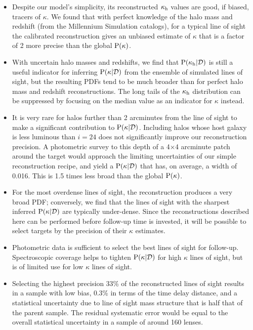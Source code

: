 \documentclass[useAMS,usenatbib]{mn2e}
\begin{document}
\begin{itemize} 

\item Despite our model's simplicity, its reconstructed $\kappa_{\rm h}$ values are
good, if biased, tracers of $\kappa$.  We found that with perfect knowledge of
the halo mass and redshift (from the Millennium Simulation catalogs), for a
typical line of sight the calibrated reconstruction gives an unbiased estimate
of $\kappa$ that is a factor of 2 more precise than the global ${\rm P}(\kappa)$.

\item With uncertain halo masses and redshifts, we find that
${\rm P}(\kappa_{\rm h}|{\mathcal{D}})$ is still a useful indicator for inferring
${\rm P}(\kappa|{\mathcal{D}})$ from the ensemble of simulated lines of sight, but the
resulting PDFs tend to be much broader than for perfect halo mass and redshift
reconstructions. The long tails of the $\kappa_{\rm h}$ distribution can be
suppressed by focusing on the median value as an indicator for $\kappa$
instead.

\item It is very rare for halos further than 2 arcminutes from the line of
sight to make a significant contribution to ${\rm P}(\kappa|{\mathcal{D}})$. Including
halos whose host galaxy is less luminous than $i=24$ does not significantly
improve our reconstruction precision.  A photometric survey to this depth of a
4$\times$4 arcminute patch around the target would approach the limiting
uncertainties of our simple reconstruction recipe, and yield a 
${\rm P}(\kappa|{\mathcal{D}})$ that has, on average, a width of 0.016. This is 1.5 times
less broad than the global ${\rm P}(\kappa)$.

\item  For the most overdense lines of sight, the reconstruction produces a
very broad PDF; conversely, we find that the lines of sight with the sharpest
inferred ${\rm P}(\kappa|{\mathcal{D}})$ are typically under-dense. Since the
reconstructions described here can be performed before follow-up time is
invested, it will be possible to  select targets by the precision of their
$\kappa$ estimates. 

\item Photometric data is sufficient  to select the best lines of sight for
follow-up. Spectroscopic coverage helps to tighten  ${\rm P}(\kappa|{\mathcal{D}})$ for
high $\kappa$ lines of sight, but is of limited use for  low $\kappa$ lines of
sight.

\item Selecting the highest precision 33\% of the reconstructed lines of sight
results in a sample with low bias, 0.3\% in terms of the time delay distance,
and a statistical uncertainty due to line of sight mass structure that is half
that of the parent sample. The residual systematic error would be equal to the
overall statistical uncertainty in a sample of around 160 lenses.


\end{itemize}
\end{document}
